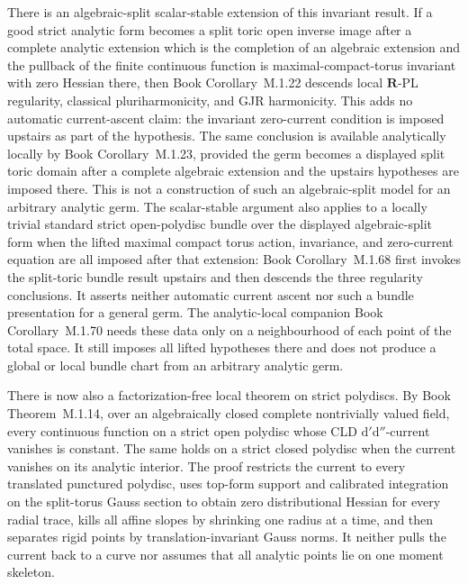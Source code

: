\documentclass[11pt,a4paper]{article}
\theoremstyle{definition}
\theoremstyle{remark}
\newcommand{\rd}{\mathrm d}
\newcommand{\dprime}{\rd'}
\newcommand{\ddprime}{\rd''}
\newcommand{\dprimeddprime}{\dprime\ddprime}
\begin{document}
There is an algebraic-split scalar-stable extension of this invariant result.
If a good strict analytic form becomes a split toric open inverse image after
a complete analytic extension which is the completion of an algebraic
extension and the pullback of the finite continuous function is
maximal-compact-torus invariant with zero Hessian there, then
Book Corollary~M.1.22 descends
local \(\mathbf R\)-PL regularity, classical pluriharmonicity, and GJR
harmonicity.  This adds no automatic current-ascent claim: the invariant
zero-current condition is imposed upstairs as part of the hypothesis.
The same conclusion is available analytically locally by
Book Corollary~M.1.23,
provided the germ becomes a displayed split toric domain after a complete
algebraic extension and the upstairs hypotheses are imposed there.  This is
not a construction of such an algebraic-split model for an arbitrary analytic
germ.
The scalar-stable argument also applies to a locally trivial standard strict
open-polydisc bundle over the displayed algebraic-split form when the lifted
maximal compact torus action, invariance, and zero-current equation are all
imposed after that extension:
Book Corollary~M.1.68
first invokes the split-toric bundle result upstairs and then descends the
three regularity conclusions.  It asserts neither automatic current ascent
nor such a bundle presentation for a general germ.
The analytic-local companion
Book Corollary~M.1.70
needs these data only on a neighbourhood of each point of the total space.
It still imposes all lifted hypotheses there and does not produce a global or
local bundle chart from an arbitrary analytic germ.

There is now also a factorization-free local theorem on strict polydiscs.
By Book Theorem~M.1.14, over an algebraically
closed complete nontrivially valued field, every continuous function on a
strict open polydisc whose CLD \(\dprimeddprime\)-current vanishes is
constant.  The same holds on a strict closed polydisc when the current
vanishes on its analytic interior.  The proof restricts the current to every
translated punctured polydisc, uses top-form support and calibrated
integration on the split-torus Gauss section to obtain zero distributional
Hessian for every radial trace, kills all affine slopes by shrinking one
radius at a time, and then separates rigid points by translation-invariant
Gauss norms.  It neither pulls the current back to a curve nor assumes that
all analytic points lie on one moment skeleton.
\end{document}
